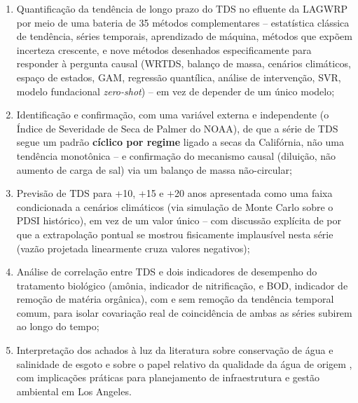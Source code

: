 \begin{enumerate}
    \item Quantificação da tendência de longo prazo do TDS no efluente da LAGWRP por meio de uma bateria de 35 métodos complementares -- estatística clássica de tendência, séries temporais, aprendizado de máquina, métodos que expõem incerteza crescente, e nove métodos desenhados especificamente para responder à pergunta causal (WRTDS, balanço de massa, cenários climáticos, espaço de estados, GAM, regressão quantílica, análise de intervenção, SVR, modelo fundacional \textit{zero-shot}) -- em vez de depender de um único modelo;
    \item Identificação e confirmação, com uma variável externa e independente (o Índice de Severidade de Seca de Palmer do NOAA), de que a série de TDS segue um padrão \textbf{cíclico por regime} ligado a secas da Califórnia, não uma tendência monotônica -- e confirmação do mecanismo causal (diluição, não aumento de carga de sal) via um balanço de massa não-circular;
    \item Previsão de TDS para +10, +15 e +20 anos apresentada como uma faixa condicionada a cenários climáticos (via simulação de Monte Carlo sobre o PDSI histórico), em vez de um valor único -- com discussão explícita de por que a extrapolação pontual se mostrou fisicamente implausível nesta série (vazão projetada linearmente cruza valores negativos);
    \item Análise de correlação entre TDS e dois indicadores de desempenho do tratamento biológico (amônia, indicador de nitrificação, e BOD, indicador de remoção de matéria orgânica), com e sem remoção da tendência temporal comum, para isolar covariação real de coincidência de ambas as séries subirem ao longo do tempo;
    \item Interpretação dos achados à luz da literatura sobre conservação de água e salinidade de esgoto \cite{schwabe2020unintended} e sobre o papel relativo da qualidade da água de origem \cite{scsc2018tds}, com implicações práticas para planejamento de infraestrutura e gestão ambiental em Los Angeles.
\end{enumerate}
